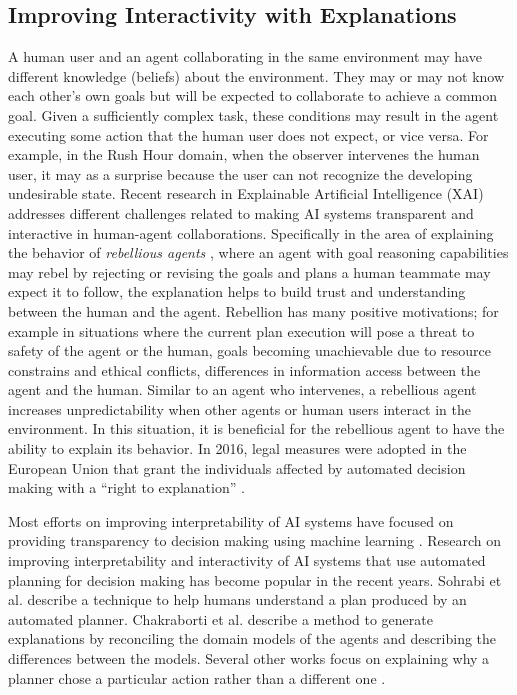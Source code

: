 \subsection{Improving Interactivity with Explanations}
A human user and an agent collaborating in the same environment may have different knowledge (beliefs) about the environment.
They may or may not know each other's own goals but will be expected to collaborate to achieve a common goal.
Given a sufficiently complex task, these conditions may result in the agent executing some action that the human user does not expect, or vice versa.
For example, in the Rush Hour domain, when the observer intervenes the human user, it may as a surprise because the user can not recognize the developing undesirable state.
Recent research in Explainable Artificial Intelligence (XAI) addresses different challenges related to making AI systems transparent and interactive in human-agent collaborations. Specifically in the area of explaining the behavior of \textit{rebellious agents} \cite{coman2015case}, where an agent with goal reasoning capabilities may rebel by rejecting or revising the goals and plans a human teammate may expect it to follow, the explanation helps to build trust and understanding between the human and the agent. 
Rebellion has many positive motivations; for example in situations where the current plan execution will pose a threat to safety of the agent or the human, goals becoming unachievable due to resource constrains and ethical conflicts, differences in information access between the agent and the human.
Similar to an agent who intervenes, a rebellious agent increases unpredictability when other agents or human users interact in the environment.
In this situation, it is beneficial for the rebellious agent to have the ability to explain its behavior.
In 2016, legal measures were adopted in the European Union that grant the individuals affected by automated decision making with a ``right to explanation'' \cite{eu2016}.

Most efforts on improving interpretability of AI systems have focused on providing transparency to decision making using machine learning \cite{ribeiro2016, lundberg2017, slack2020}. 
Research on improving interpretability and interactivity of AI systems that use automated planning for decision making has become popular in the recent years. Sohrabi et al. \citeyear{sohrabi2011} describe a technique to help humans understand a plan produced by an automated planner. Chakraborti et al. \citeyear{chakraborti2019} describe a method to generate explanations by reconciling the domain models of the agents and describing the differences between the models. 
Several other works focus on explaining why a planner chose a particular action rather than a different one
\cite{langley2017explainable, fox2017xai}.

